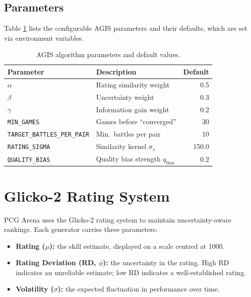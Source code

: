\documentclass[shortabstract, mgr, english]{iithesis}
\begin{document}
\subsection{Parameters}
\label{subsec:sd-agis-params}

Table \ref{tab:agis-params} lists the configurable AGIS parameters and their defaults,
which are set via environment variables.

\begin{table}[H]
\centering
\begin{tabular}{llr}
\toprule
\textbf{Parameter} & \textbf{Description} & \textbf{Default} \\
\midrule
$\alpha$ & Rating similarity weight & 0.5 \\
$\beta$  & Uncertainty weight       & 0.3 \\
$\gamma$ & Information gain weight  & 0.2 \\
\texttt{MIN\_GAMES}            & Games before ``converged''  & 30 \\
\texttt{TARGET\_BATTLES\_PER\_PAIR} & Min.\ battles per pair & 10 \\
\texttt{RATING\_SIGMA}        & Similarity kernel $\sigma_s$ & 150.0 \\
\texttt{QUALITY\_BIAS}        & Quality bias strength $q_{\text{bias}}$ & 0.2 \\
\bottomrule
\end{tabular}
\caption{AGIS algorithm parameters and default values.}
\label{tab:agis-params}
\end{table}

\section{Glicko-2 Rating System}
\label{sec:sd-rating}

PCG Arena uses the Glicko-2 rating system \cite{glickman2012glicko2} to maintain
uncertainty-aware rankings. Each generator carries three parameters:

\begin{itemize}
    \item \textbf{Rating ($\mu$):} the skill estimate, displayed on a scale centred at 1000.
    \item \textbf{Rating Deviation (RD, $\phi$):} the uncertainty in the rating. High RD
          indicates an unreliable estimate; low RD indicates a well-established rating.
    \item \textbf{Volatility ($\sigma$):} the expected fluctuation in performance over time.
\end{itemize}
\end{document}
